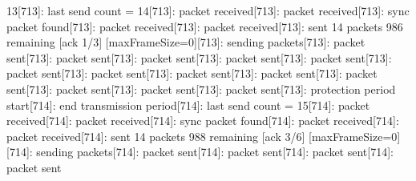 \documentclass[parskip]{cs4rep}
\begin{document}
13[713]: last send count = 14[713]: packet received[713]: packet received[713]: sync packet found[713]: packet received[713]: packet received[713]: sent 14 packets 986 remaining [ack 1/3] [maxFrameSize=0][713]: sending packets[713]: packet sent[713]: packet sent[713]: packet sent[713]: packet sent[713]: packet sent[713]: packet sent[713]: packet sent[713]: packet sent[713]: packet sent[713]: packet sent[713]: packet sent[713]: packet sent[713]: packet sent[713]: protection period start[714]: end transmission period[714]: last send count = 15[714]: packet received[714]: packet received[714]: sync packet found[714]: packet received[714]: packet received[714]: sent 14 packets 988 remaining [ack 3/6] [maxFrameSize=0][714]: sending packets[714]: packet sent[714]: packet sent[714]: packet sent[714]: packet sent\newline
\end{document}
